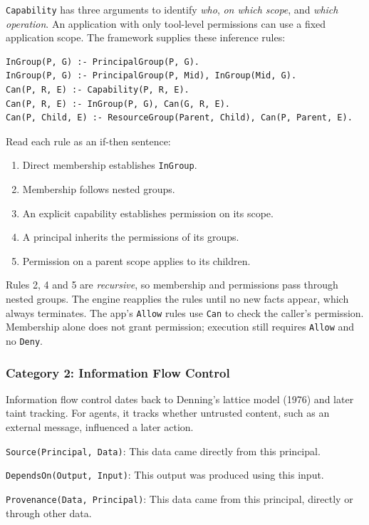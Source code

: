 \documentclass[10pt,letterpaper]{article}
\newcommand{\pred}[2]{\texttt{#1}: #2\par}
\begin{document}
\texttt{Capability} has three arguments to identify \emph{who},
\emph{on which scope}, and \emph{which operation}. An application with
only tool-level permissions can use a fixed application scope.
The framework supplies these inference rules:

\begin{lstlisting}
InGroup(P, G) :- PrincipalGroup(P, G).
InGroup(P, G) :- PrincipalGroup(P, Mid), InGroup(Mid, G).
Can(P, R, E) :- Capability(P, R, E).
Can(P, R, E) :- InGroup(P, G), Can(G, R, E).
Can(P, Child, E) :- ResourceGroup(Parent, Child), Can(P, Parent, E).
\end{lstlisting}
Read each rule as an if-then sentence:
\begin{enumerate}
\item Direct membership establishes \texttt{InGroup}.
\item Membership follows nested groups.
\item An explicit capability establishes permission on its scope.
\item A principal inherits the permissions of its groups.
\item Permission on a parent scope applies to its children.
\end{enumerate}
Rules 2, 4 and 5 are \emph{recursive}, so membership and permissions pass
through nested groups. The engine reapplies the
rules until no new facts appear, which always terminates. The app's
\texttt{Allow} rules use \texttt{Can} to check the caller's permission.
Membership alone does not grant permission; execution still requires
\texttt{Allow} and no \texttt{Deny}.

\subsubsection{Category 2: Information Flow Control}
\label{sec:cat-ifc}

Information flow control dates back to Denning's lattice model (1976) and
later taint tracking. For agents, it tracks whether untrusted content, such
as an external message, influenced a later action.

\pred{Source(Principal, Data)}{This data came directly from this principal.}
\pred{DependsOn(Output, Input)}{This output was produced using this input.}
\pred{Provenance(Data, Principal)}{This data came from this principal,
directly or through other data.}
\end{document}
